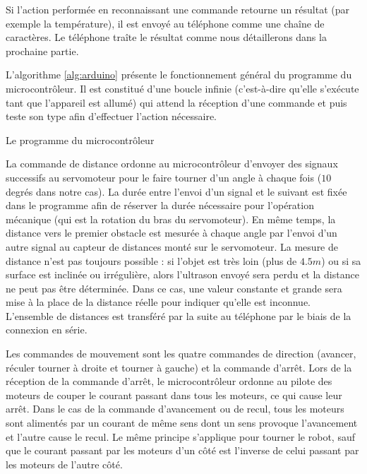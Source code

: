 Si l'action performée en reconnaissant une commande retourne un résultat (par
exemple la température), il est envoyé au téléphone comme une chaîne de
caractères. Le téléphone traîte le résultat comme nous détaillerons dans la prochaine partie.

L'algorithme \ref{alg:arduino} présente le fonctionnement général du programme du
microcontrôleur. Il est constitué d'une boucle infinie (c'est-à-dire qu'elle
s'exécute tant que l'appareil est allumé) qui attend la réception d'une commande
et puis teste son type afin d'effectuer l'action nécessaire.

\smallskip

\begin{algorithm}[h]
\caption{Le programme du microcontrôleur\label{alg:arduino}}
\BlankLine
{}
\end{algorithm}

La commande de distance ordonne au microcontrôleur d'envoyer des signaux
successifs au servomoteur pour le faire tourner d'un angle à chaque fois ($10$ degrés
dans notre cas). La durée entre l'envoi d'un signal et le suivant est fixée dans
le programme afin de réserver la durée nécessaire pour l'opération mécanique (qui
est la rotation du bras du servomoteur). En même temps, la distance vers le
premier obstacle est mesurée à chaque angle par l'envoi d'un autre signal au capteur
de distances monté sur le servomoteur. La mesure de distance n'est pas toujours
possible : si l'objet est très loin (plus de $4.5m$) ou si sa surface est inclinée
ou irrégulière, alors l'ultrason envoyé sera perdu et la distance ne peut pas être
déterminée. Dans ce cas, une valeur constante et grande sera mise à la place de la
distance réelle pour indiquer qu'elle est inconnue. L'ensemble de distances est
transféré par la suite au téléphone par le biais de la connexion en série.

Les commandes de mouvement sont les quatre commandes de direction (avancer, réculer
tourner à droite et tourner à gauche) et la commande d'arrêt. Lors de la
réception de la commande d'arrêt, le microcontrôleur ordonne au pilote des moteurs
de couper le courant passant dans tous les moteurs, ce qui cause leur arrêt. Dans
le cas de la commande d'avancement ou de recul, tous les moteurs sont alimentés
par un courant de même sens dont un sens provoque l'avancement et l'autre cause
le recul. Le même principe s'applique pour tourner le robot, sauf que le courant
passant par les moteurs d'un côté est l'inverse de celui passant par les moteurs
de l'autre côté.

